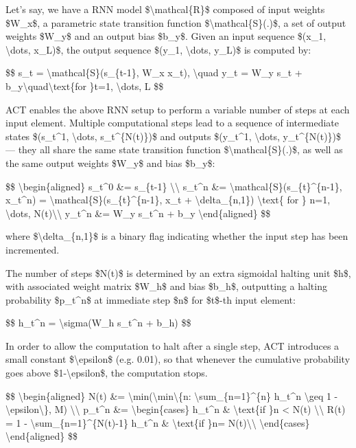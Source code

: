 Let's say, we have a RNN model \$\textbackslash mathcal\{R\}\$ composed of input weights \$W\_x\$, a parametric state transition function \$\textbackslash mathcal\{S\}(.)\$, a set of output weights \$W\_y\$ and an output bias \$b\_y\$. Given an input sequence \$(x\_1, \textbackslash dots, x\_L)\$, the output sequence \$(y\_1, \textbackslash dots, y\_L)\$ is computed by:

\$\$ s\_t = \textbackslash mathcal\{S\}(s\_\{t-1\}, W\_x x\_t), \textbackslash quad y\_t = W\_y s\_t + b\_y\textbackslash quad\textbackslash text\{for \}t=1, \textbackslash dots, L \$\$

ACT enables the above RNN setup to perform a variable number of steps at each input element. Multiple computational steps lead to a sequence of intermediate states \$(s\_t\^{}1, \textbackslash dots, s\_t\^{}\{N(t)\})\$ and outputs \$(y\_t\^{}1, \textbackslash dots, y\_t\^{}\{N(t)\})\$ --- they all share the same state transition function \$\textbackslash mathcal\{S\}(.)\$, as well as the same output weights \$W\_y\$ and bias \$b\_y\$:

\$\$ \textbackslash begin\{aligned\} s\_t\^{}0 \&= s\_\{t-1\} \textbackslash\textbackslash{} s\_t\^{}n \&= \textbackslash mathcal\{S\}(s\_\{t\}\^{}\{n-1\}, x\_t\^{}n) = \textbackslash mathcal\{S\}(s\_\{t\}\^{}\{n-1\}, x\_t + \textbackslash delta\_\{n,1\}) \textbackslash text\{ for \} n=1, \textbackslash dots, N(t)\textbackslash\textbackslash{} y\_t\^{}n \&= W\_y s\_t\^{}n + b\_y \textbackslash end\{aligned\} \$\$

where \$\textbackslash delta\_\{n,1\}\$ is a binary flag indicating whether the input step has been incremented.

The number of steps \$N(t)\$ is determined by an extra sigmoidal halting unit \$h\$, with associated weight matrix \$W\_h\$ and bias \$b\_h\$, outputting a halting probability \$p\_t\^{}n\$ at immediate step \$n\$ for \$t\$-th input element:

\$\$ h\_t\^{}n = \textbackslash sigma(W\_h s\_t\^{}n + b\_h) \$\$

In order to allow the computation to halt after a single step, ACT introduces a small constant \$\textbackslash epsilon\$ (e.g. 0.01), so that whenever the cumulative probability goes above \$1-\textbackslash epsilon\$, the computation stops.

\$\$ \textbackslash begin\{aligned\} N(t) \&= \textbackslash min(\textbackslash min\textbackslash\{n\textquotesingle: \textbackslash sum\_\{n=1\}\^{}\{n\textquotesingle\} h\_t\^{}n \textbackslash geq 1 -\textbackslash epsilon\textbackslash\}, M) \textbackslash\textbackslash{} p\_t\^{}n \&= \textbackslash begin\{cases\} h\_t\^{}n \& \textbackslash text\{if \}n \textless{} N(t) \textbackslash\textbackslash{} R(t) = 1 - \textbackslash sum\_\{n=1\}\^{}\{N(t)-1\} h\_t\^{}n \& \textbackslash text\{if \}n= N(t)\textbackslash\textbackslash{} \textbackslash end\{cases\} \textbackslash end\{aligned\} \$\$

